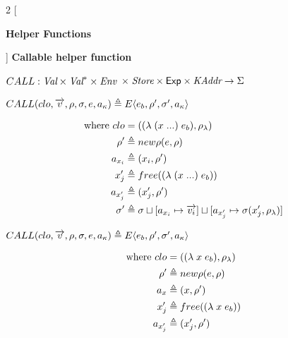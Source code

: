 \documentclass[12pt,draft]{article}
\newcommand{\E}[4]{E\langle #1 , #2 , #3 , #4 \rangle}
\begin{document}
\begin{multicols*}{2}
  [
  \begin{center}
    \textbf{Helper Functions}
  \end{center}
  ]
  \noindent
  \textbf{Callable helper function}
  \begin{center}
    $ CALL : \textit{Val} \times \textit{Val}^* \times \textit{Env}$
    $\times \; \textit{Store} \times \textsf{Exp} \times \textit{KAddr} \rightarrow \Sigma $ \\
  \end{center}
  \begin{center}
    $CALL(clo , \overrightarrow{v} , \cenv , \cstore , e, \ckaddr)
            \triangleq \E{e_b}{\cenv'}{\cstore'}{\ckaddr}$
  \end{center}
  \vspace{-7mm}
  \begin{align*}
    \text{where }
    clo &= ((\lambda \; (x \; ...) \; e_b) , \rho_{\lambda}) \\
    \rho' &\triangleq new\rho(e , \rho) \\
    a_{x_i} &\triangleq (x_i , \rho') \\
    x_j' &\triangleq free((\lambda \; (x \; ...) \; e_b)) \\
    a_{x_j'} &\triangleq (x_j' , \rho') \\
    \sigma' &\triangleq \sigma
               \sqcup [a_{x_i} \mapsto \overrightarrow{v_i}]
               \sqcup [a_{x_j'} \mapsto \sigma(x_j' , \rho_{\lambda})]
  \end{align*}
  \begin{center}
    $CALL(clo , \overrightarrow{v} , \cenv , \cstore , e , \ckaddr)
             \triangleq \E{e_b}{\cenv'}{\cstore'}{\ckaddr}$ \\
  \end{center}
  \vspace{-7mm}
  \begin{align*}
    \text{where }
    clo &= ((\lambda \; x \; e_b) , \cenv_{\lambda}) \\
    \cenv' &\triangleq \cnewenv(e , \cenv) \\
    a_x &\triangleq (x , \cenv') \\
    x_j' &\triangleq free((\lambda \; x \; e_b)) \\
    a_{x_j'} &\triangleq (x_j' , \cenv') \\

\end{align*}
\end{multicols*}
\end{document}
